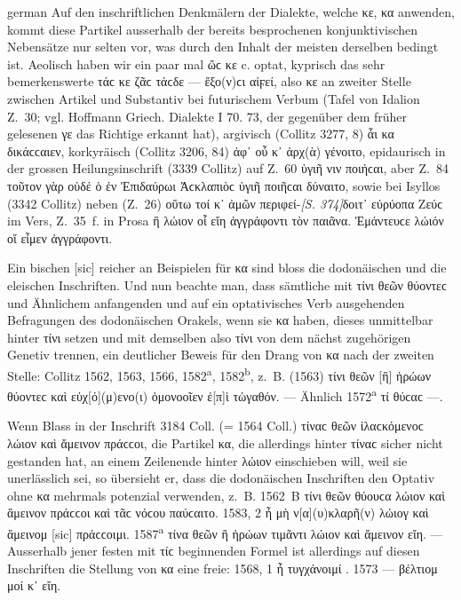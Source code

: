 \begin{otherlanguage*}{german}
Auf den inschriftlichen Denkmälern der Dialekte, welche κε, κα anwenden, kommt diese Partikel ausserhalb der bereits besprochenen konjunktivischen Nebensätze nur selten vor, was durch den Inhalt der meisten derselben bedingt ist. Aeolisch haben wir ein paar mal ὤϲ κε c. optat, kyprisch das sehr bemerkenswerte τάϲ κε ζᾶϲ τάϲδε — ἔξο(ν)ϲι αἰϝεί, also κε an zweiter Stelle zwischen Artikel und Substantiv bei futurischem Verbum (Tafel von Idalion Z.~30; vgl. Hoffmann Griech. Dialekte I 70. 73, der gegenüber dem früher gelesenen γε das Richtige erkannt hat), argivisch (Collitz 3277, 8) ἇι κα δικάϲϲαιεν, korkyräisch (Collitz 3206, 84) ἀφ᾽ οὗ κ᾽ ἀρχ(ὰ) γένοιτο, epidaurisch in der grossen Heilungsinschrift (3339 Collitz) auf Z.~60   ὑγιῆ νιν ποιήϲαι, aber Z.~84 τοῦτον γὰρ οὐδέ  ὁ ἐν Ἐπιδαύρωι Ἀϲκλαπιὸϲ ὑγιῆ ποιῆϲαι δύναιτο, sowie bei Isyllos (3342 Collitz) neben (Z.~26) οὕτω τοί κ᾽ ἀμῶν περιφεί-\hypertarget{p374}{\emph{[S. 374]}}\label{p374}δοιτ᾽ εὐρύοπα Ζεύϲ im Vers, Z.~35~f. in Prosa ἢ λώιον οἷ  εἴη ἀγγράφοντι τὸν παιᾶνα. Ἐμάντευϲε λώιόν οἵ  εἶμεν ἀγγράφοντι.

Ein bischen [sic] reicher an Beispielen für κα sind bloss die dodonäischen und die eleischen Inschriften. Und nun beachte man, dass sämtliche mit τίνι θεῶν θύοντεϲ und Ähnlichem anfangenden und auf ein optativisches Verb ausgehenden Befragungen des dodonäischen Orakels, wenn sie κα haben, dieses unmittelbar hinter τίνι setzen und mit demselben also τίνι von dem nächst zugehörigen Genetiv trennen, ein deutlicher Beweis für den Drang von κα nach der zweiten Stelle: Collitz 1562, 1563, 1566, 1582\textsuperscript{a}, 1582\textsuperscript{b}, z.~B. (1563) τίνι  θεῶν [ἢ] ἡρώων θύοντεϲ καὶ εὐχ[ό](μ)ενο(ι) ὁμονοοῖεν ἐ[π]ὶ τὠγαθόν. — Ähnlich 1572\textsuperscript{a} τί  θύϲαϲ —.

Wenn Blass in der Inschrift 3184 Coll. (= 1564 Coll.) τίναϲ θεῶν ἱλαϲκόμενοϲ λώιον καὶ ἄμεινον πράϲϲοι, die Partikel κα, die allerdings hinter τίναϲ sicher nicht gestanden hat, an einem Zeilenende hinter λώιον einschieben will, weil sie unerlässlich sei, so übersieht er, dass die dodonäischen Inschriften den Optativ ohne κα mehrmals potenzial verwenden, z.~B. 1562~B τίνι θεῶν θύουϲα λώιον καὶ ἄμεινον πράϲϲοι καὶ τᾶϲ νόϲου παύϲαιτο. 1583, 2 ἦ μὴ ν[α](υ)κλαρῆ(ν) λώιογ καὶ ἄμεινομ [sic] πράϲϲοιμι. 1587\textsuperscript{a} τίνα θεῶν ἢ ἡρώων τιμᾶντι λώιον καὶ ἄμεινον εἴη. — Ausserhalb jener festen mit τίϲ beginnenden Formel ist allerdings auf diesen Inschriften die Stellung von κα eine freie: 1568, 1 ἦ τυγχάνοιμί . 1573 — βέλτιομ μοί κ᾽ εἴη.


\end{otherlanguage*}
